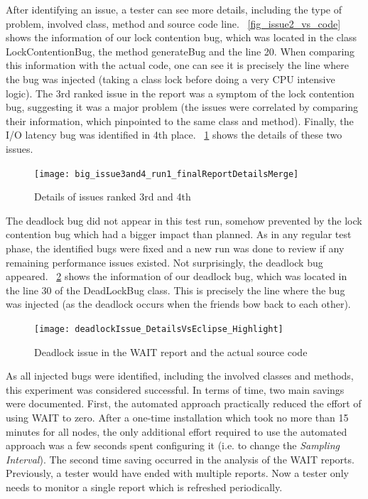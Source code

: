 \documentclass[runningheads,a4paper]{llncs}
\begin{document}
After identifying an issue, a tester can see more details, including the type of
problem, involved class, method and source code line. \figurename
~\ref{fig_issue2_vs_code} shows the information of our lock contention bug,
which was located in the class LockContentionBug, the method generateBug and the
line 20. When comparing this information with the actual code, one can see it
is precisely the line where the bug was injected (taking a class lock before
doing a very CPU intensive logic). The 3rd ranked issue in the report was a
symptom of the lock contention bug, suggesting it was a major problem (the
issues were correlated by comparing their information, which pinpointed to the same class and
method). Finally, the I/O latency bug was identified in 4th place. \figurename
~\ref{fig_issues34} shows the details of these two issues.

\begin{figure}[!h]
\centering
\texttt{[image: big\_issue3and4\_run1\_finalReportDetailsMerge]}
\caption{Details of issues ranked 3rd and 4th}
\label{fig_issues34}
\end{figure}

The deadlock bug did not appear in this test run, somehow prevented by the
lock contention bug which had a bigger impact than planned. As in any regular
test phase, the identified bugs were fixed and a new run was done to review
if any remaining performance issues existed. Not surprisingly, the deadlock bug
appeared. \figurename ~\ref{fig_dlissue_vs_code} shows the information of our
deadlock bug, which was located in the line 30 of the DeadLockBug class. This is
precisely the line where the bug was injected (as the deadlock occurs when the
friends bow back to each other).

\begin{figure}[!h]
\centering
\texttt{[image: deadlockIssue\_DetailsVsEclipse\_Highlight]}
\caption{Deadlock issue in the WAIT report and the actual source code}
\label{fig_dlissue_vs_code}
\end{figure}


As all injected bugs were identified, including the involved classes and
methods, this experiment was considered successful. In terms of time, two main
savings were documented. First, the automated approach practically reduced the
effort of using WAIT to zero. After a one-time installation which took no more
than 15 minutes for all nodes, the only additional effort required to use the
automated approach was a few seconds spent configuring it (i.e. to change the
\emph{Sampling Interval}). The second time saving occurred in the analysis of the 
WAIT reports. Previously, a tester would have ended with multiple reports. Now a 
tester only needs to monitor a single report which is refreshed periodically.
\end{document}
